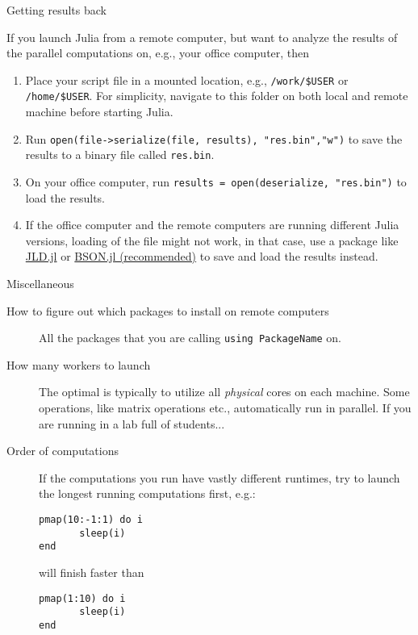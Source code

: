\documentclass{beamer}
\begin{document}
\begin{frame}{Getting results back}

If you launch Julia from a remote computer, but want to analyze the results of the parallel computations on, e.g., your office computer, then
\begin{enumerate}
	\item Place your script file in a mounted location, e.g., \texttt{/work/\$USER} or \texttt{/home/\$USER}. For simplicity, navigate to this folder on both local and remote machine before starting Julia.
	\item Run \texttt{open(file->serialize(file, results), "res.bin","w")} to save the results to a binary file called \texttt{res.bin}.
	\item On your office computer, run \texttt{results = open(deserialize, "res.bin")} to load the results.
    \item If the office computer and the remote computers are running different Julia versions, loading of the file might not work, in that case, use a package like \href{https://github.com/JuliaIO/JLD.jl}{JLD.jl} or \href{https://github.com/MikeInnes/BSON.jl}{BSON.jl (recommended)} to save and load the results instead.
\end{enumerate}
\end{frame}



\begin{frame}[fragile]{Miscellaneous}
\begin{description}
	\item[How to figure out which packages to install on remote computers] All the packages that you are calling \texttt{using PackageName} on.
	\item[How many workers to launch] The optimal is typically to utilize all \emph{physical} cores on each machine. Some operations, like matrix operations etc., automatically run in parallel. If you are running in a lab full of students...
	\item[Order of computations] If the computations you run have vastly different runtimes, try to launch the longest running computations first, e.g.:
	\begin{verbatim}
pmap(10:-1:1) do i
       sleep(i)
end
	\end{verbatim}
	will finish faster than
	\begin{verbatim}
pmap(1:10) do i
       sleep(i)
end
	\end{verbatim}
\end{description}
\end{frame}
\end{document}
